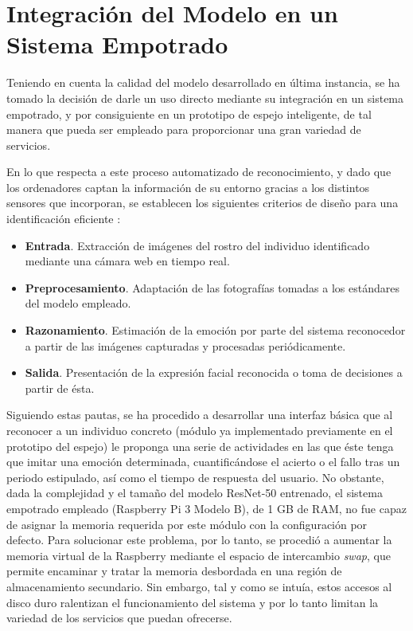 \chapter{Integración del Modelo en un Sistema Empotrado} \label{Chapter:7}

Teniendo en cuenta la calidad del modelo desarrollado en última instancia, se ha tomado la decisión de darle un uso directo mediante su integración en un sistema empotrado, y por consiguiente en un prototipo de espejo inteligente, de tal manera que pueda ser empleado para proporcionar una gran variedad de servicios.

En lo que respecta a este proceso automatizado de reconocimiento, y dado que los ordenadores captan la información de su entorno gracias a los distintos sensores que incorporan, se establecen los siguientes criterios de diseño para una identificación eficiente \cite{Picard}:
\begin{itemize}
    \item \textbf{Entrada}. Extracción de imágenes del rostro del individuo identificado mediante una cámara web en tiempo real.
    \item \textbf{Preprocesamiento}. Adaptación de las fotografías tomadas a los estándares del modelo empleado.
    \item \textbf{Razonamiento}. Estimación de la emoción por parte del sistema reconocedor a partir de las imágenes capturadas y procesadas periódicamente.
    \item \textbf{Salida}. Presentación de la expresión facial reconocida o toma de decisiones a partir de ésta.
\end{itemize}

Siguiendo estas pautas, se ha procedido a desarrollar una interfaz básica que al reconocer a un individuo concreto (módulo ya implementado previamente en el prototipo del espejo) le proponga una serie de actividades en las que éste tenga que imitar una emoción determinada, cuantificándose el acierto o el fallo tras un periodo estipulado, así como el tiempo de respuesta del usuario. No obstante, dada la complejidad y el tamaño del modelo ResNet-50 entrenado, el sistema empotrado empleado (Raspberry Pi 3 Modelo B), de 1 GB de RAM, no fue capaz de asignar la memoria requerida por este módulo con la configuración por defecto. Para solucionar este problema, por lo tanto, se procedió a aumentar la memoria virtual de la Raspberry mediante el espacio de intercambio \textit{swap}, que permite encaminar y tratar la memoria desbordada en una región de almacenamiento secundario. Sin embargo, tal y como se intuía, estos accesos al disco duro ralentizan el funcionamiento del sistema y por lo tanto limitan la variedad de los servicios que puedan ofrecerse.

